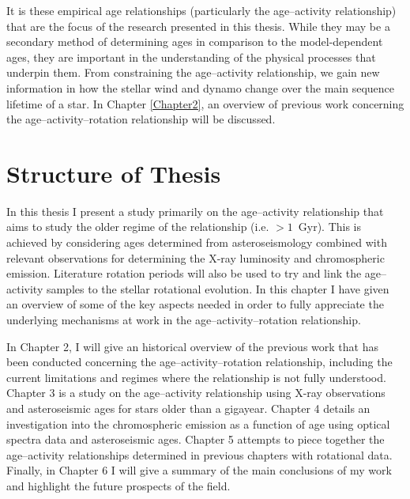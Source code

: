 It is these empirical age relationships (particularly the age--activity relationship) that are the focus of the research presented in this thesis. While they may be a secondary method of determining ages in comparison to the model-dependent ages, they are important in the understanding of the physical processes that underpin them. From constraining the age--activity relationship, we gain new information in how the stellar wind and dynamo change over the main sequence lifetime of a star. In Chapter \ref{Chapter2}, an overview of previous work concerning the age--activity--rotation relationship will be discussed.

\section{Structure of Thesis}
In this thesis I present a study primarily on the age--activity relationship that aims to study the older regime of the relationship (i.e. $> 1$~Gyr). This is achieved by considering ages determined from asteroseismology combined with relevant observations for determining the X-ray luminosity and chromospheric emission. Literature rotation periods will also be used to try and link the age--activity samples to the stellar rotational evolution. In this chapter I have given an overview of some of the key aspects needed in order to fully appreciate the underlying mechanisms at work in the age--activity--rotation relationship.

In Chapter 2, I will give an historical overview of the previous work that has been conducted concerning the age--activity--rotation relationship, including the current limitations and regimes where the relationship is not fully understood. Chapter 3 is a study on the age--activity relationship using X-ray observations and asteroseismic ages for stars older than a gigayear. Chapter 4 details an investigation into the chromospheric emission as a function of age using optical spectra data and asteroseismic ages. Chapter 5 attempts to piece together the age--activity relationships determined in previous chapters with rotational data. Finally, in Chapter 6 I will give a summary of the main conclusions of my work and highlight the future prospects of the field.